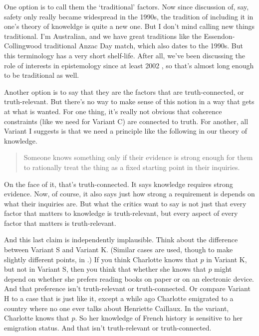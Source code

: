 \documentclass[11pt,]{book}
\begin{document}
One option is to call them the `traditional' factors. Now since discussion of, say, safety only really became widespread in the 1990s, the tradition of including it in one's theory of knoweldge is quite a new one. But I don't mind calling new things traditional. I'm Australian, and we have great traditions like the Essendon-Collingwood traditional Anzac Day match, which also dates to the 1990s. But this terminology has a very short shelf-life. After all, we've been discussing the role of interests in epistemology since at least 2002 \citep{FantlMcGrath2002}, so that's almost long enough to be traditional as well.

Another option is to say that they are the factors that are truth-connected, or truth-relevant. But there's no way to make sense of this notion in a way that gets at what is wanted. For one thing, it's really not obvious that coherence constraints (like we need for Variant C) are connected to truth. For another, all Variant I suggests is that we need a principle like the following in our theory of knowledge.

\begin{quote}
Someone knows something only if their evidence is strong enough for them to rationally treat the thing as a fixed starting point in their inquiries.
\end{quote}

On the face of it, that's truth-connected. It says knowledge requires strong evidence. Now, of course, it also says just how strong a requirement is depends on what their inquiries are. But what the critics want to say is not just that every factor that matters to knowledge is truth-relevant, but every aspect of every factor that matters is truth-relevant.

And this last claim is independently implausible. Think about the difference between Variant S and Variant K. (Similar cases are used, though to make slightly different points, in \citet{Gendler2005}.) If you think Charlotte knows that \(p\) in Variant K, but not in Variant S, then you think that whether she knows that \(p\) might depend on whether she prefers reading books on paper or on an electronic device. And that preference isn't truth-relevant or truth-connected. Or compare Variant H to a case that is just like it, except a while ago Charlotte emigrated to a country where no one ever talks about Henriette Caillaux. In the variant, Charlotte knows that \(p\). So her knowledge of French history is sensitive to her emigration status. And that isn't truth-relevant or truth-connected.
\end{document}

